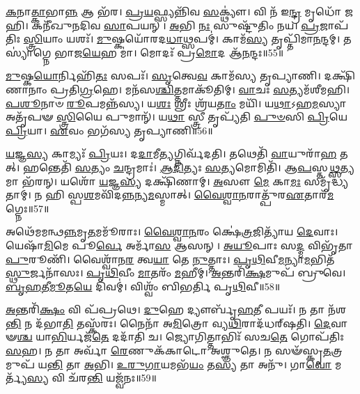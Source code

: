 \-\ul{𑌕}\-𑌨𑌾\-\ul{𑌤𑍍𑌕𑌾}\-𑌭𑌾\-\ul{𑌨𑍍𑌨} 𑌆 𑌭᳴𑌰।
\-\ul{𑌪𑍍𑌰}\-\-\ul{𑌯}\-𑌫𑍍𑌸𑍍𑌯𑌨𑍍𑌨𑌿᳴𑌵 \ul{𑌸}\-𑌕𑍍𑌥𑍍𑌯𑍗॑।
𑌵𑌿 𑌨᳴ 𑌇\-\ul{𑌨𑍍𑌦𑍍𑌰} 𑌮𑍃𑌧𑍋᳴ 𑌜𑌹𑌿।
𑌕𑌨𑍀᳴𑌖𑍁𑌨𑌦𑌿𑌵 \ul{𑌸𑌾}\-𑌪𑌯𑌨𑍍।
\-\ul{𑌅}\-𑌭𑌿 \ul{𑌨𑌃} 𑌸𑍁𑌷𑍍𑌟𑍁᳴𑌤𑌿𑌂 𑌨𑌯।
\-\ul{𑌪𑍍𑌰}\-𑌜𑌾\-𑌪᳴𑌤𑌿𑌃 \ul{𑌸𑍍𑌤𑍍𑌰𑌿}\-𑌯𑌾𑌂 𑌯𑌶𑌃᳴।
\-\ul{𑌮𑍁}\-𑌷𑍍𑌕𑌯𑍋᳴𑌰𑌦\-\ul{𑌧𑌾}\-𑌥𑍍𑌸𑌪𑌮𑍍॑।
𑌕𑌾𑌮᳴\-\ul{𑌸𑍍𑌯} 𑌤𑍃𑌪𑍍𑌤𑌿᳴𑌮𑌾\-\ul{𑌨}\-𑌨𑍍𑌦𑌮𑍍।
𑌤𑌸𑍍𑌯𑌾॑𑌗𑍍𑌨𑍇 𑌭𑌾𑌜\-\ul{𑌯𑍇}\-𑌹 𑌮𑌾॑।
𑌮𑍋𑌦𑌃᳴ 𑌪𑍍𑌰\-\ul{𑌮𑍋}\-𑌦 𑌆᳴\-\ul{𑌨}\-𑌨𑍍𑌦𑌃॥55॥

\-\ul{𑌮𑍁}\-𑌷𑍍𑌕\-\ul{𑌯𑍋}\-𑌰𑍍𑌨𑌿𑌹𑌿᳴\-\ul{𑌤𑌃} 𑌸𑌪𑌃᳴।
\-\ul{𑌸𑍃}\-𑌤𑍍𑌵𑍇\-\ul{𑌵} 𑌕𑌾𑌮᳴𑌸𑍍𑌯 𑌤𑍃𑌪𑍍𑌯𑌾𑌣𑌿।
𑌦𑌕𑍍𑌷𑌿᳴𑌣𑌾𑌨𑌾𑌂 𑌪𑍍𑌰𑌤𑌿\-\ul{𑌗𑍍𑌰}\-𑌹𑍇।
𑌮𑌨᳴𑌸\-\ul{𑌶𑍍𑌚𑌿}\-𑌤𑍍𑌤𑌮𑌾𑌕𑍂᳴𑌤𑌿𑌮𑍍।
\-\ul{𑌵𑌾}\-𑌚𑌃 \ul{𑌸}\-𑌤𑍍𑌯𑌮᳴𑌶𑍀𑌮𑌹𑌿।
\-\ul{𑌪}\-\-\ul{𑌶𑍂}\-𑌨𑌾𑍞 \ul{𑌰𑍂}\-𑌪𑌮𑌨𑍍𑌨᳴𑌸𑍍𑌯।
𑌯\-\ul{𑌶𑌃} 𑌶𑍍𑌰𑍀𑌃 𑌶𑍍𑌰᳴𑌯\-\ul{𑌤𑌾𑌂} 𑌮𑌯𑌿᳴।
𑌯\-\ul{𑌥𑌾}\-𑌽𑌹\-\ul{𑌮}\-𑌸𑍍𑌯𑌾 𑌅𑌤𑍃᳴𑌪𑍟 \ul{𑌸𑍍𑌤𑍍𑌰𑌿}\-𑌯𑍈 𑌪𑍁𑌮𑌾𑌨𑍍᳴।
𑌯\-\ul{𑌥𑌾} 𑌸𑍍𑌤𑍍𑌰𑍀 𑌤𑍃𑌪𑍍𑌯᳴𑌤𑌿 \ul{𑌪𑍁}\-\-\ul{𑍞}\-𑌸𑌿 \ul{𑌪𑍍𑌰𑌿}\-𑌯𑍇 \ul{𑌪𑍍𑌰𑌿}\-𑌯𑌾।
\-\ul{𑌏}\-𑌵𑌂 𑌭𑌗᳴𑌸𑍍𑌯 𑌤𑍃𑌪𑍍𑌯𑌾𑌣𑌿॥56॥

\-\ul{𑌯}\-𑌜𑍍𑌞\-\ul{𑌸𑍍𑌯} 𑌕𑌾𑌮𑍍𑌯𑌃᳴ \ul{𑌪𑍍𑌰𑌿}\-𑌯𑌃।
𑌦\-\ul{𑌦𑌾}\-𑌮𑍀\-\ul{𑌤𑍍𑌯}\-𑌗𑍍𑌨𑌿𑌰𑍍𑌵᳴𑌦𑌤𑌿।
𑌤𑌥𑍇𑌤𑌿᳴ \ul{𑌵𑌾}\-𑌯𑍁𑌰𑌾᳴\-\ul{𑌹} 𑌤𑌤𑍍।
𑌹𑌨𑍍𑌤𑍇𑌤𑌿᳴ \ul{𑌸}\-𑌤𑍍𑌯𑌂 \ul{𑌚}\-𑌨𑍍𑌦𑍍𑌰𑌮𑌾𑌃॑।
\-\ul{𑌆}\-\-\ul{𑌦𑌿}\-𑌤𑍍𑌯𑌃 \ul{𑌸}\-𑌤𑍍𑌯𑌮𑍋𑌮𑌿𑌤𑌿᳴।
𑌆\-\ul{𑌪}\-𑌸𑍍𑌤\-\ul{𑌥𑍍𑌸}\-𑌤𑍍𑌯𑌮𑌾 𑌭᳴𑌰𑌨𑍍।
𑌯𑌶𑍋᳴ \ul{𑌯}\-𑌜𑍍𑌞\-\ul{𑌸𑍍𑌯} 𑌦𑌕𑍍𑌷𑌿᳴𑌣𑌾𑌮𑍍।
\-\ul{𑌅}\-𑌸𑍗 \ul{𑌮𑍇} 𑌕𑌾\-\ul{𑌮𑌃} 𑌸𑌮𑍃᳴𑌦𑍍𑌧𑍍𑌯𑌤𑌾𑌮𑍍।
𑌨 𑌹𑌿 𑌸𑍍𑌪\-\ul{𑌶}\-𑌮𑌵𑌿᳴𑌦\-\ul{𑌨𑍍𑌨}\-𑌨𑍍𑌯\-\ul{𑌮}\-𑌸𑍍𑌮𑌾𑌤𑍍।
\-\ul{𑌵𑍈}\-\-\ul{𑌶𑍍𑌵𑌾}\-\-\ul{𑌨}\-𑌰𑌾𑌤𑍍𑌪𑍁᳴𑌰\-\ul{𑌏}\-𑌤𑌾𑌰᳴\-\ul{𑌮}\-𑌗𑍍𑌨𑍇𑌃॥57॥

𑌅𑌥𑍇᳴𑌮𑌮𑌨𑍍𑌥\-\ul{𑌨𑍍𑌨}\-𑌮𑍃\-\ul{𑌤}\-𑌮𑌮𑍂᳴𑌰𑌾𑌃।
\-\ul{𑌵𑍈}\-\-\ul{𑌶𑍍𑌵𑌾}\-\-\ul{𑌨}\-𑌰𑌂 𑌕𑍍𑌷𑍇॑\-\ul{𑌤𑍍𑌰}\-𑌜𑌿𑌤𑍍𑌯𑌾᳴𑌯 \ul{𑌦𑍇}\-𑌵𑌾𑌃।
𑌯𑍇𑌷𑌾᳴\-\ul{𑌮𑌿}\-𑌮𑍇 𑌪𑍂\-\ul{𑌰𑍍𑌵𑍇} 𑌅𑌰𑍍𑌮𑌾᳴\-\ul{𑌸} 𑌆𑌸𑌨𑍍।
\-\ul{𑌅}\-\-\ul{𑌯𑍂}\-𑌪𑌾𑌃 𑌸\-\ul{𑌦𑍍𑌮} 𑌵𑌿𑌭𑍃᳴𑌤𑌾 \ul{𑌪𑍁}\-𑌰𑍂𑌣𑌿᳴।
𑌵𑍈𑌶𑍍𑌵𑌾᳴𑌨\-\ul{𑌰} 𑌤𑍍𑌵\-\ul{𑌯𑌾} 𑌤𑍇 \ul{𑌨𑍁}\-𑌤𑍍𑌤𑌾𑌃।
\-\ul{𑌪𑍃}\-\-\ul{𑌥𑌿}\-𑌵𑍀\-\ul{𑌮}\-𑌨𑍍𑌯𑌾\-\ul{𑌮}\-𑌭𑌿𑌤᳴\-\ul{𑌸𑍍𑌥𑍁}\-𑌰𑍍𑌜𑌨𑌾᳴𑌸𑌃।
\-\ul{𑌪𑍃}\-\-\ul{𑌥𑌿}\-𑌵𑍀𑌂 \ul{𑌮𑌾}\-𑌤𑌰𑌂᳴ \ul{𑌮}\-𑌹𑍀𑌮𑍍।
\-\ul{𑌅}\-𑌨𑍍𑌤𑌰𑌿᳴\-\ul{𑌕𑍍𑌷}\-𑌮𑍁𑌪᳴ 𑌬𑍍𑌰𑍁𑌵𑍇।
\-\ul{𑌬𑍃}\-\-\ul{𑌹}\-𑌤𑍀\-\ul{𑌮𑍂}\-𑌤\-\ul{𑌯𑍇} 𑌦𑌿𑌵𑌮𑍍॑।
𑌵𑌿𑌶𑍍𑌵𑌂᳴ 𑌬𑌿𑌭𑌰𑍍𑌤𑌿 𑌪𑍃\-\ul{𑌥𑌿}\-𑌵𑍀॥58॥

\-\ul{𑌅}\-𑌨𑍍𑌤𑌰𑌿᳴\-\ul{𑌕𑍍𑌷𑌂} 𑌵𑌿 𑌪᳴𑌪𑍍𑌰𑌥𑍇।
\-\ul{𑌦𑍁}\-𑌹𑍇 𑌦𑍍𑌯𑍗𑌰𑍍𑌬𑍃᳴\-\ul{𑌹}\-𑌤𑍀 𑌪𑌯𑌃᳴।
𑌨 𑌤𑌾 𑌨᳴𑌶\-\ul{𑌨𑍍𑌤𑌿} 𑌨 𑌦᳴𑌭𑌾\-\ul{𑌤𑌿} 𑌤𑌸𑍍𑌕᳴𑌰𑌃।
𑌨𑍈𑌨𑌾᳴ 𑌅\-\ul{𑌮𑌿}\-𑌤𑍍𑌰𑍋 𑌵𑍍𑌯\-\ul{𑌥𑌿}\-𑌰𑌾𑌦᳴𑌧𑌰𑍍‌\mbox{}𑌷𑌤𑌿।
\-\ul{𑌦𑍇}\-𑌵𑌾𑍟\-\ul{𑌶𑍍𑌚} 𑌯𑌾\-\ul{𑌭𑌿}\-𑌰𑍍𑌯𑌜᳴\-\ul{𑌤𑍇} 𑌦𑌦𑌾᳴𑌤𑌿 𑌚।
𑌜𑍍𑌯𑍋𑌗𑌿𑌤𑍍𑌤𑌾𑌭𑌿𑌃᳴ 𑌸𑌚\-\ul{𑌤𑍇} 𑌗𑍋𑌪᳴𑌤𑌿𑌃 \ul{𑌸}\-𑌹।
𑌨 𑌤𑌾 𑌅𑌰𑍍𑌵𑌾᳴ \ul{𑌰𑍇}\-𑌣𑍁𑌕᳴𑌕𑌾𑌟𑍋 𑌅𑌶𑍍𑌞𑍁𑌤𑍇।
𑌨 𑌸𑍟᳴𑌸𑍍𑌕𑍃\-\ul{𑌤}\-𑌤𑍍𑌰𑌮𑍁𑌪᳴ 𑌯\-\ul{𑌨𑍍𑌤𑌿} 𑌤𑌾 \ul{𑌅}\-𑌭𑌿।
\-\ul{𑌉}\-\-\ul{𑌰𑍁}\-\-\ul{𑌗𑌾}\-𑌯𑌮𑌭᳴\-\ul{𑌯𑌂} 𑌤\-\ul{𑌸𑍍𑌯} 𑌤𑌾 𑌅𑌨𑍁᳴।
𑌗𑌾\-\ul{𑌵𑍋} 𑌮𑌰𑍍𑌤𑍍𑌯᳴\-\ul{𑌸𑍍𑌯} 𑌵𑌿 𑌚᳴𑌰\-\ul{𑌨𑍍𑌤𑌿} 𑌯𑌜𑍍𑌵᳴𑌨𑌃॥59॥

